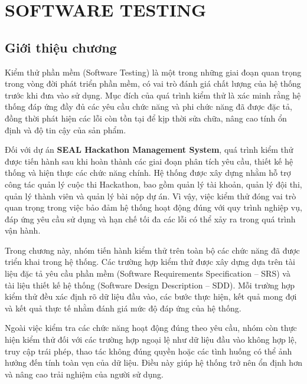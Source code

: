 
\chapter{SOFTWARE TESTING}

\section{Giới thiệu chương}

Kiểm thử phần mềm (Software Testing) là một trong những giai đoạn quan trọng trong vòng đời phát triển phần mềm, có vai trò đánh giá chất lượng của hệ thống trước khi đưa vào sử dụng. Mục đích của quá trình kiểm thử là xác minh rằng hệ thống đáp ứng đầy đủ các yêu cầu chức năng và phi chức năng đã được đặc tả, đồng thời phát hiện các lỗi còn tồn tại để kịp thời sửa chữa, nâng cao tính ổn định và độ tin cậy của sản phẩm.

Đối với dự án \textbf{SEAL Hackathon Management System}, quá trình kiểm thử được tiến hành sau khi hoàn thành các giai đoạn phân tích yêu cầu, thiết kế hệ thống và hiện thực các chức năng chính. Hệ thống được xây dựng nhằm hỗ trợ công tác quản lý cuộc thi Hackathon, bao gồm quản lý tài khoản, quản lý đội thi, quản lý thành viên và quản lý bài nộp dự án. Vì vậy, việc kiểm thử đóng vai trò quan trọng trong việc bảo đảm hệ thống hoạt động đúng với quy trình nghiệp vụ, đáp ứng yêu cầu sử dụng và hạn chế tối đa các lỗi có thể xảy ra trong quá trình vận hành.

Trong chương này, nhóm tiến hành kiểm thử trên toàn bộ các chức năng đã được triển khai trong hệ thống. Các trường hợp kiểm thử được xây dựng dựa trên tài liệu đặc tả yêu cầu phần mềm (Software Requirements Specification – SRS) và tài liệu thiết kế hệ thống (Software Design Description – SDD). Mỗi trường hợp kiểm thử đều xác định rõ dữ liệu đầu vào, các bước thực hiện, kết quả mong đợi và kết quả thực tế nhằm đánh giá mức độ đáp ứng của hệ thống.

Ngoài việc kiểm tra các chức năng hoạt động đúng theo yêu cầu, nhóm còn thực hiện kiểm thử đối với các trường hợp ngoại lệ như dữ liệu đầu vào không hợp lệ, truy cập trái phép, thao tác không đúng quyền hoặc các tình huống có thể ảnh hưởng đến tính toàn vẹn của dữ liệu. Điều này giúp hệ thống trở nên ổn định hơn và nâng cao trải nghiệm của người sử dụng.

